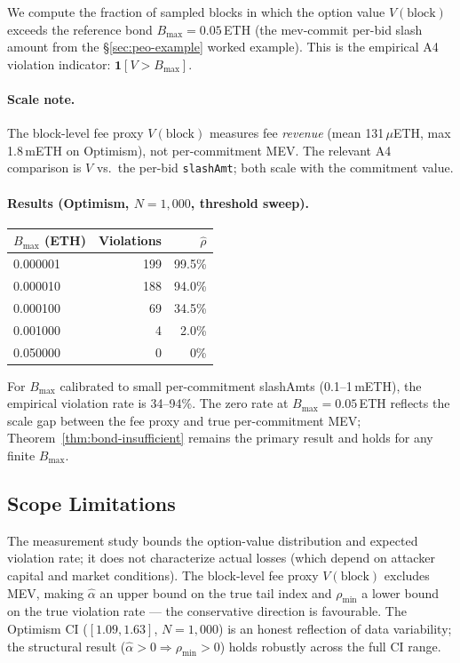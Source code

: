 We compute the fraction of sampled blocks in which the option value
$V(\text{block})$ exceeds the reference bond $B_{\max} = 0.05$\,ETH
(the mev-commit per-bid slash amount from the \S\ref{sec:peo-example}
worked example). This is the empirical A4 violation indicator:
$\mathbf{1}[V > B_{\max}]$.

\paragraph{Scale note.}
The block-level fee proxy $V(\text{block})$ measures fee \emph{revenue}
(mean 131\,$\mu$ETH, max 1.8\,mETH on Optimism), not per-commitment MEV.
The relevant A4 comparison is $V$ vs.\ the per-bid \texttt{slashAmt};
both scale with the commitment value.

\paragraph{Results (Optimism, $N=1{,}000$, threshold sweep).}
\begin{center}
\small
\begin{tabular}{@{}lrr@{}}
\toprule
$B_{\max}$ (ETH) & Violations & $\hat{\rho}$ \\
\midrule
0.000001 & 199 & 99.5\% \\
0.000010 & 188 & 94.0\% \\
0.000100 & 69  & 34.5\% \\
0.001000 & 4   & 2.0\%  \\
0.050000 & 0   & 0\%    \\
\bottomrule
\end{tabular}
\end{center}

\noindent For $B_{\max}$ calibrated to small per-commitment slashAmts
(0.1--1\,mETH), the empirical violation rate is 34--94\%.
The zero rate at $B_{\max} = 0.05$\,ETH reflects the scale gap between
the fee proxy and true per-commitment MEV; Theorem~\ref{thm:bond-insufficient}
remains the primary result and holds for any finite $B_{\max}$.

\subsection{Scope Limitations}
\label{sec:meas-limits}

The measurement study bounds the option-value distribution and expected
violation rate; it does not characterize actual losses (which depend on
attacker capital and market conditions). The block-level fee proxy
$V(\text{block})$ excludes MEV, making $\hat{\alpha}$ an upper bound on
the true tail index and $\rho_{\min}$ a lower bound on the true violation
rate --- the conservative direction is favourable. The Optimism CI
($[1.09, 1.63]$, $N=1{,}000$) is an honest reflection of data variability;
the structural result ($\hat{\alpha} > 0 \Rightarrow \rho_{\min} > 0$)
holds robustly across the full CI range.
